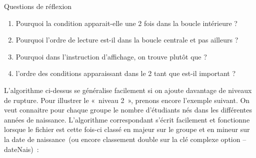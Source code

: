 
\begin{Emphase}[reflexion]{Questions de réflexion}
\begin{enumerate}
	\item 
		Pourquoi la condition 
		apparait-elle une 2 fois dans la boucle 
		intérieure ?
	\item 
		Pourquoi l’ordre de lecture est-il dans la boucle centrale et pas
		ailleurs ?
	\item 
		Pourquoi dans l’instruction d'affichage, on trouve
		 plutôt que  ?
	\item 
		l’ordre des conditions apparaissant dans le 2 tant
		que est-il important ?
\end{enumerate}
\end{Emphase}

L’algorithme ci-dessus se généralise facilement si on ajoute davantage
de niveaux de rupture. Pour illustrer le «~niveau 2~», prenons encore
l’exemple suivant. On veut connaitre pour chaque groupe le nombre
d’étudiants nés dans les différentes années de naissance. L’algorithme
correspondant s’écrit facilement et fonctionne lorsque le fichier est
cette fois-ci classé en majeur sur le groupe et en mineur sur la date
de naissance~(ou encore classement double sur la clé complexe option –
dateNais)~:

